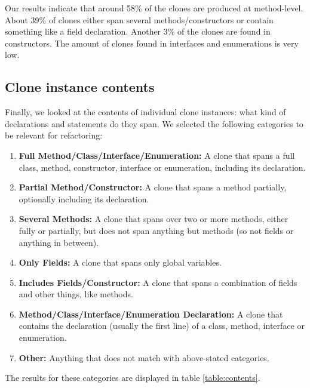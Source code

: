 \documentclass[a4paper]{article}
\begin{document}
Our results indicate that around 58\% of the clones are produced at method-level. About 39\% of clones either span several methods/constructors or contain something like a field declaration. Another 3\% of the clones are found in constructors. The amount of clones found in interfaces and enumerations is very low.

\subsection{Clone instance contents}\label{chap:clonecontents}
Finally, we looked at the contents of individual clone instances: what kind of declarations and statements do they span. We selected the following categories to be relevant for refactoring:
\begin{enumerate}
  \item \textbf{Full Method/Class/Interface/Enumeration:} A clone that spans a full class, method, constructor, interface or enumeration, including its declaration.
  \item \textbf{Partial Method/Constructor:} A clone that spans a method partially, optionally including its declaration.
  \item \textbf{Several Methods:} A clone that spans over two or more methods, either fully or partially, but does not span anything but methods (so not fields or anything in between).
  \item \textbf{Only Fields:} A clone that spans only global variables.
  \item \textbf{Includes Fields/Constructor:} A clone that spans a combination of fields and other things, like methods.
  \item \textbf{Method/Class/Interface/Enumeration Declaration:} A clone that contains the declaration (usually the first line) of a class, method, interface or enumeration.
  \item \textbf{Other:} Anything that does not match with above-stated categories.
\end{enumerate}

The results for these categories are displayed in table \ref{table:contents}.
\end{document}
